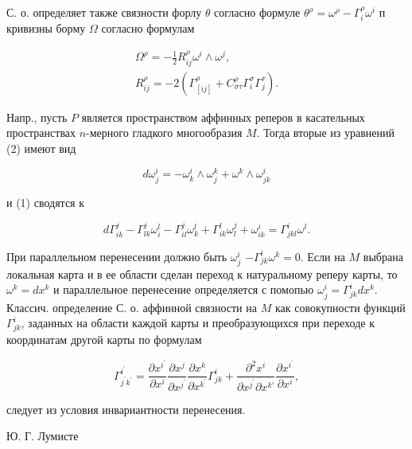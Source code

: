 \documentclass[10pt]{article}
\begin{document}
С. о. определяет также связности форлу $\theta$ согласно формуле $\theta^{\rho}=\omega^{\rho}-\Gamma_{i}^{\rho} \omega^{i}$ п кривизны борму $\Omega$ согласно формулам



\[

\begin{gathered}

\Omega^{\rho}=-\frac{1}{2} R_{i j}^{\rho} \omega^{i} \wedge \omega^{j}, \\

R_{i j}^{\rho}=-2\left(\Gamma_{[i j]}^{\rho}+C_{\sigma \tau}^{\rho} \Gamma_{i}^{\sigma} \Gamma_{j}^{\tau}\right) .

\end{gathered}

\]



Напр., пусть $P$ является пространством аффинных реперов в касательных пространствах $n$-мерного гладкого многообразия $M$. Тогда вторые из уравнений (2) имеют вид



\[

d \omega_{j}^{i}=-\omega_{k}^{i} \wedge \omega_{j}^{k}+\omega^{k} \wedge \omega_{j k}^{i}

\]



и (1) сводятся к



\[

d \Gamma_{i k}^{j}-\Gamma_{l k}^{j} \omega_{i}^{l}-\Gamma_{i l}^{j} \omega_{k}^{l}+\Gamma_{i k}^{l} \omega_{l}^{j}+\omega_{i k}^{i}=\Gamma_{j k l}^{i} \omega^{l} .

\]



При параллельном перенесении должно быть $\omega_{j}^{i}$ $-\Gamma_{j k}^{i} \omega^{k}=0$. Если на $M$ выбрана локальная карта и в ее области сделан переход к натуральному реперу карты, то $\omega^{k}=d x^{k}$ и параллельное перенесение определяется с помопью $\omega_{j}^{i}=\Gamma_{j k}^{i} d x^{k}$. Классич. определение С. о. аффинной связности на $M$ как совокупности функций $\Gamma_{j k}^{i}$, заданных на области каждой карты и преобразующихся при переходе к координатам другой карты по формулам



\[

\Gamma_{j^{\prime} k^{\prime}}^{i^{\prime}}=\frac{\partial x^{i^{\prime}}}{\partial x^{i}} \frac{\partial x^{j}}{\partial x^{j^{\prime}}} \frac{\partial x^{k}}{\partial x^{k^{\prime}}} \Gamma_{j k}^{i}+\frac{\partial^{2} x^{i}}{\partial x^{j^{\prime}} \partial x^{k \prime}} \frac{\partial x^{i^{\prime}}}{\partial x^{i}},

\]



следует из условия инвариантности перенесения.



Ю. Г. Лумисте
\end{document}
